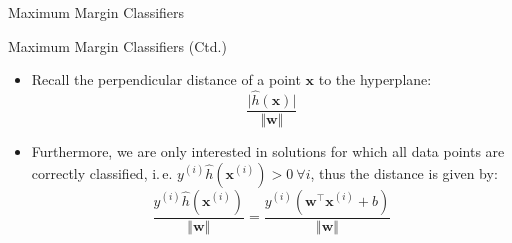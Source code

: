 \begin{frame}{Maximum Margin Classifiers}{}\important
\end{frame}


\begin{frame}{Maximum Margin Classifiers (Ctd.)}{}
	\begin{itemize}
		\item Recall the perpendicular distance of a point $\bm{x}$ to the hyperplane:
		\begin{equation}
			\frac{\vert \widehat{h}(\bm{x}) \vert}{\Vert \bm{w} \Vert}
		\end{equation}
		\item Furthermore, we are only interested in solutions for which all data points are correctly classified, i.\,e. 
			$y^{(i)} \widehat{h}(\bm{x}^{(i)}) > 0\ \forall i$, thus the distance is given by:
		\begin{equation}
			\frac{y^{(i)} \widehat{h}(\bm{x}^{(i)})}{\Vert \bm{w} \Vert} = \frac{y^{(i)} (\bm{w}^{\intercal} \bm{x}^{(i)} + b)}{\Vert \bm{w} \Vert}
		\end{equation}
	\end{itemize}
\end{frame}



